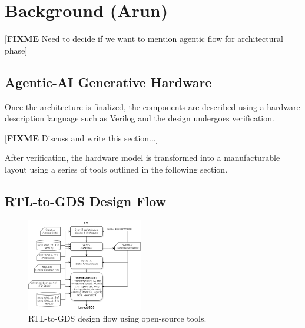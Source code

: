 \section{Background (Arun)}
\label{sec:background}

[\textbf{FIXME} Need to decide if we want to mention agentic flow for architectural phase]

\subsection{Agentic-AI Generative Hardware}

Once the architecture is finalized, the components are described using a hardware description language such as Verilog and the design undergoes verification. 

[\textbf{FIXME} Discuss and write this section...]

After verification, the hardware model is transformed into a manufacturable layout using a series of tools outlined in the following section.

\subsection{RTL-to-GDS Design Flow}

\begin{figure}[htbp]
	\includegraphics[width=0.45\textwidth]{figs/rtl2gds-toolchain.png}
	\caption{RTL-to-GDS design flow using open-source tools.}
	\label{fig:RTL-to-GDS}
\end{figure}

